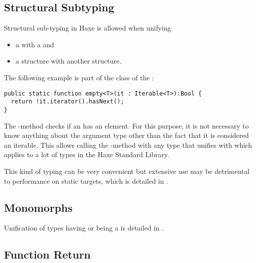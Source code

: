 \subsection{Structural Subtyping}
\label{type-system-structural-subtyping}


Structural sub-typing in Haxe is allowed when unifying

\begin{itemize}
	\item a  with a  and
	\item a structure with another structure.
\end{itemize}

The following example is part of the  class of the :

\begin{lstlisting}
public static function empty<T>(it : Iterable<T>):Bool {
  return !it.iterator().hasNext();
}
\end{lstlisting}
The -method checks if an  has an element. For this purpose, it is not necessary to know anything about the argument type other than the fact that it is considered an iterable. This allows calling the -method with any type that unifies with  which applies to a lot of types in the Haxe Standard Library.

This kind of typing can be very convenient but extensive use may be detrimental to performance on static targets, which is detailed in .


\subsection{Monomorphs}
\label{type-system-monomorphs}

Unification of types having or being a  is detailed in .


\subsection{Function Return}
\label{type-system-unification-function-return}


